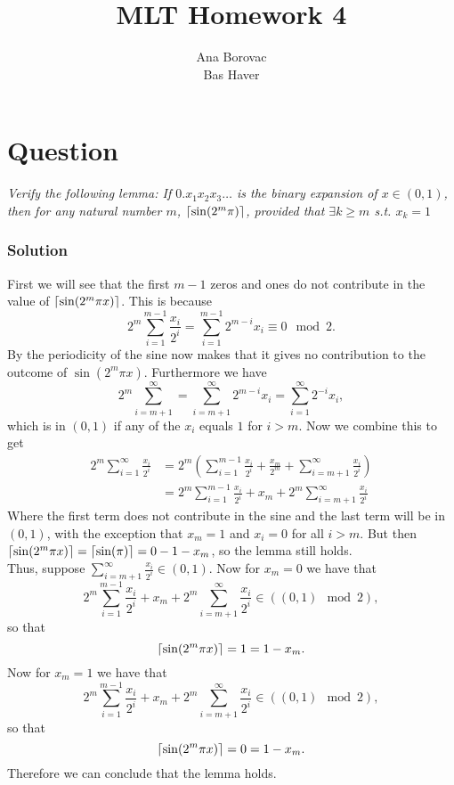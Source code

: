 \documentclass{article}
\title{MLT Homework 4}
\author{Ana Borovac  \\ Bas Haver}
\DeclarePairedDelimiter\ceil{\lceil}{\rceil}
\newcounter{counterquestion}
\newenvironment{question}[1]
{
\stepcounter{counterquestion}
\section*{Question \thecounterquestion}
\emph{#1} 
} 
{
}
\newenvironment{solution}
{
\subsubsection*{Solution}
} 
{
}
\begin{document}
\maketitle

\begin{question}{Verify the following lemma: If $0.x_1x_2x_3\dots $ is the binary expansion of $x\in (0,1)$, then for any natural number $m$, $\ceil{\sin (2^m \pi ) }$, provided that $\exists k \geq m$ s.t. $x_k=1$}
\begin{solution}
First we will see that the first $m-1$ zeros and ones do not contribute in the value of $\ceil{ \sin (2^m \pi x)}$. This is because $$2^m \sum _{i=1} ^{m-1} \frac{x_i}{2^i}=\sum _{i=1} ^{m-1} 2^{m-i} x_i \equiv 0 \mod 2.$$
By the periodicity of the sine now makes that it gives no contribution to the outcome of $\sin (2^m \pi x)$. Furthermore we have $$2^m \sum _{i=m+1} ^{\infty } =\sum _{i=m+1} ^{\infty} 2^{m-i}x_i=\sum _{i=1} ^{\infty } 2^{-i} x_i,$$ which is in $(0,1)$ if any of the $x_i$ equals $1$ for $i>m$. Now we combine this to get 
\begin{align*}
2^m \sum _{i=1} ^{\infty} \frac{x_i}{2^i}&=2^m (\sum _{i=1} ^{m-1} \frac{x_i}{2^i}+ \frac{x_m}{2^m} + \sum _{i=m+1} ^{\infty} \frac{x_i}{2^i})\\
&= 2^m \sum _{i=1} ^{m-1} \frac{x_i}{2^i} +x_m + 2^m\sum _{i=m+1} ^{\infty} \frac{x_i}{2^i}
\end{align*}
Where the first term does not contribute in the sine and the last term will be in $(0,1)$, with the exception that $x_m=1$ and $x_i=0$ for all $i>m$. But then $\ceil{ \sin (2^m \pi x) }= \ceil {\sin (\pi ) }=0-1-x_m$, so the lemma still holds.\\
Thus, suppose $\sum _{i=m+1} ^{\infty } \frac{x_i}{2^i}\in (0,1)$. Now for $x_m=0$ we have that $$2^m \sum _{i=1} ^{m-1} \frac{x_i}{2^i} +x_m + 2^m\sum _{i=m+1} ^{\infty} \frac{x_i}{2^i} \in ((0,1) \mod 2),$$
so that $$\ceil{ \sin (2^m \pi x ) } = 1=1-x_m.$$
Now for $x_m=1$ we have that $$2^m \sum _{i=1} ^{m-1} \frac{x_i}{2^i} +x_m + 2^m\sum _{i=m+1} ^{\infty} \frac{x_i}{2^i} \in ((0,1) \mod 2),$$
so that $$\ceil{ \sin (2^m \pi x ) } = 0=1-x_m.$$
Therefore we can conclude that the lemma holds.
\end{solution}
\end{question}
\end{document}
